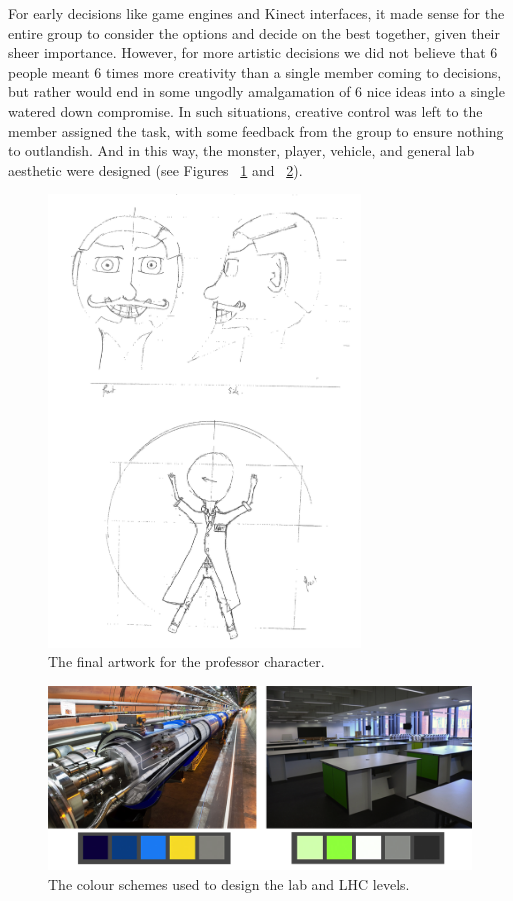 \documentclass[a4paper,oneside]{memoir}
\begin{document}
		For early decisions like game engines and Kinect interfaces, it made sense for the entire group to consider the options and decide on the best together, given their sheer importance.
		However, for more artistic decisions we did not believe that 6 people meant 6 times more creativity than a single member coming to decisions, but rather would end in some ungodly amalgamation of 6 nice ideas into a single watered down compromise.
		In such situations, creative control was left to the member assigned the task, with some feedback from the group to ensure nothing to outlandish.
		And in this way, the monster, player, vehicle, and general lab aesthetic were designed (see Figures ~\ref{fig:FinalProfessor} and ~\ref{fig:ColourScheme}).

		\begin{figure}[ht]
			\begin{center}
				\includegraphics[height=120mm]{../Screenshots/Artwork/van-dyke-final.png}
				\caption{The final artwork for the professor character.}
				\label{fig:FinalProfessor}
			\end{center}
		\end{figure}

		\begin{figure}[ht]
			\begin{center}
				\includegraphics[width=120mm]{../Screenshots/Artwork/colour-scheme.png}
				\caption{The colour schemes used to design the lab and LHC levels.}
				\label{fig:ColourScheme}
			\end{center}
		\end{figure}
\end{document}
